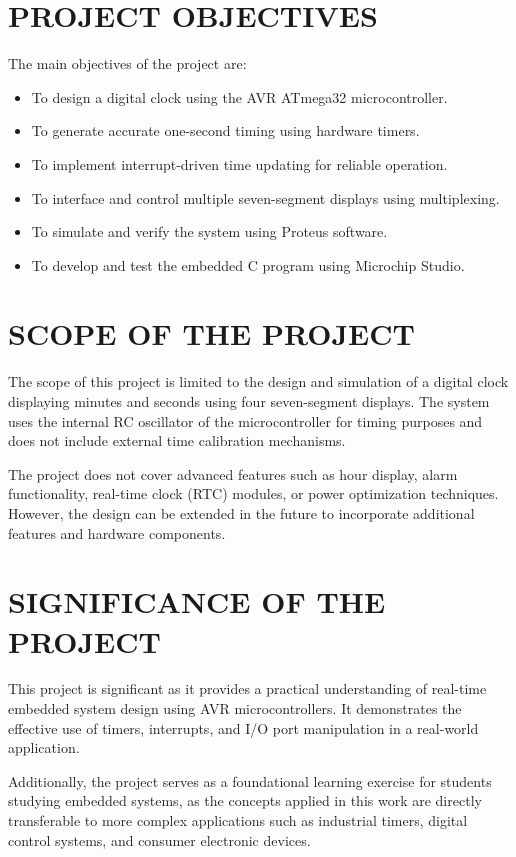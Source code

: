 \section{PROJECT OBJECTIVES}
The main objectives of the project are:
\begin{itemize}
    \item To design a digital clock using the AVR ATmega32 microcontroller.
    \item To generate accurate one-second timing using hardware timers.
    \item To implement interrupt-driven time updating for reliable operation.
    \item To interface and control multiple seven-segment displays using multiplexing.
    \item To simulate and verify the system using Proteus software.
    \item To develop and test the embedded C program using Microchip Studio.
\end{itemize}
\enumitemEndSpacing{}

\section{SCOPE OF THE PROJECT}
The scope of this project is limited to the design and simulation of a digital clock displaying 
minutes and seconds using four seven-segment displays. The system uses the internal RC 
oscillator of the microcontroller for timing purposes and does not include external time 
calibration mechanisms.

The project does not cover advanced features such as hour display, alarm functionality, 
real-time clock (RTC) modules, or power optimization 
techniques. However, the design can be 
extended in the future to incorporate additional features and hardware components.

\section{SIGNIFICANCE OF THE PROJECT}
This project is significant as it provides a practical understanding of real-time embedded 
system design using AVR microcontrollers. It demonstrates the effective use of timers, 
interrupts, and I/O port manipulation in a real-world application.

Additionally, the project serves as a foundational learning exercise for students studying 
embedded systems, as the concepts applied in this work are directly transferable to more 
complex applications such as industrial timers, digital control systems, and consumer 
electronic devices.

